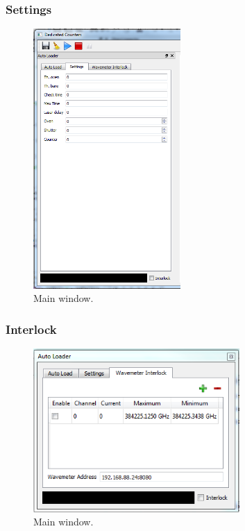 \documentclass[11pt]{scrartcl}
\begin{document}
\subsubsection{Settings}
\begin{figure}[htbp]
\begin{center}
\includegraphics[width=0.5\textwidth]{AutoloadSettings}
\end{center}
\caption{\label{AutoloadSettings} Main window.}
\end{figure}



\subsubsection{Interlock}
\begin{figure}[htbp]
\begin{center}
\includegraphics[width=0.7\textwidth]{WavemeterInterlock}
\end{center}
\caption{\label{WavemeterInterlock} Main window.}
\end{figure}
\end{document}
